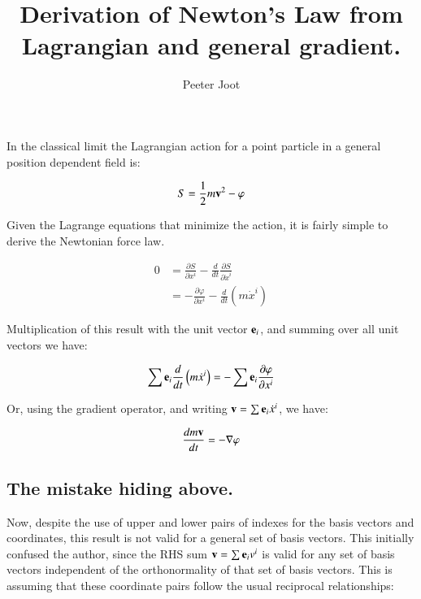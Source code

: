 \documentclass{article}
\title{ Derivation of Newton's Law from Lagrangian and general gradient.}
\author{Peeter Joot}
\newcommand{\grad}[0]{\nabla}
\newcommand{\PD}[2]{ \frac{\partial{#1}}{\partial {#2}} }
\begin{document}
             

\maketitle{}

\section{}

In the classical limit the Lagrangian action for a point particle in a general 
position dependent field is:

\begin{equation}
S = \frac{1}{2} m\mathbf{v}^2 - \varphi
\end{equation}

Given the Lagrange equations that minimize the action, it is fairly simple
to derive the Newtonian force law.

\begin{align*}
0
&= \PD{S}{x^i} - \frac{d}{dt}\PD{S}{\dot{x}^i} \\
&= -\PD{\varphi}{x^i} - \frac{d}{dt}\left(m \dot{x}^i\right)
\end{align*}

Multiplication of this result with the unit vector $\mathbf{e}_i$, and summing over 
all unit vectors we have:

\begin{equation*}
\sum \Be_i \frac{d}{dt}\left(m \dot{x}^i\right) = - \sum \Be_i \PD{\varphi}{x^i} 
\end{equation*}

Or, using the gradient operator, and writing $\mathbf{v} = \sum \mathbf{e}_i \dot{x}^i$, we have:

\begin{equation}
\frac{d m \Bv}{dt} = - \grad \varphi
\end{equation}

\subsection{ The mistake hiding above. }

Now, despite the use of upper and lower pairs of indexes for the basis vectors and coordinates, this 
result is not valid for a general set of basis vectors.  This initially confused the author, since the RHS
sum $\mathbf{v} = \sum \mathbf{e}_i v^i$ is valid for any set of basis vectors independent of the orthonormality of that 
set of basis vectors.  This is assuming that these coordinate pairs follow the usual reciprocal relationships:
\end{document}
